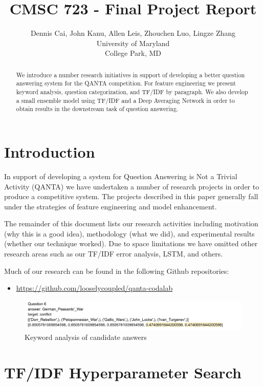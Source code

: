 \documentclass[11pt,a4paper]{article}
\title{CMSC 723 - Final Project Report}
\author{Dennis Cai, John Kanu, Allen Leis, Zhouchen Luo, Lingze Zhang \\
  University of Maryland \\ College Park, MD \\
}
\date{}
\begin{document}
\maketitle
\begin{abstract}
  We introduce a number research initiatives in support of developing a better question answering system for the \textsc{QANTA} competition.  For feature engineering we present keyword analysis, question categorization, and \textsc{TF/IDF} by paragraph.  We also develop a small ensemble model using \textsc{TF/IDF} and a Deep Averaging Network in order to obtain results in the downstream task of question answering.
\end{abstract}


\section{Introduction}

In support of developing a system for Question Answering is Not a Trivial Activity (\textsc{QANTA}) we have undertaken a number of research projects in order to produce a competitive system.  The projects described in this paper generally fall under the strategies of feature engineering and model enhancement.

The remainder of this document lists our research activities including motivation (why this is a good idea), methodology (what we did), and experimental results (whether our technique worked).  Due to space limitations we have omitted other research areas such as our \textsc{TF/IDF} error analysis, LSTM, and others.

Much of our research can be found in the following Github repositories:

\begin{itemize}
  \itemsep0em
  \small
  \item \url{https://github.com/looselycoupled/qanta-codalab}
\end{itemize}

\begin{figure}[t]
  \includegraphics[width=\textwidth]{assets/question-6.png}
  \caption{Keyword analysis of candidate answers}
  \label{fig:question6}
\end{figure}


\section{\textsc{TF/IDF} Hyperparameter Search}
\end{document}
